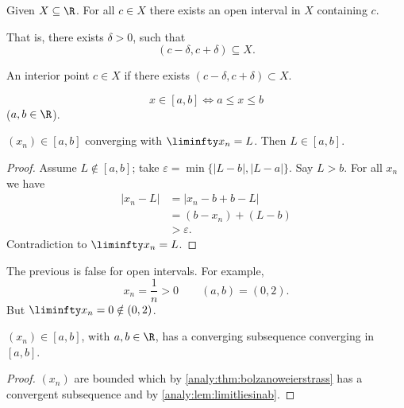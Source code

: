 \documentclass[10pt, a4paper]{article}
\begin{document}
\begin{definition}
    Given $X \subseteq \R$. For all $c \in X$ there exists an open interval in $X$ containing $c$.
    
    That is,
    there exists $\delta > 0$,
    such that
    \[
    (c - \delta, c + \delta) \subseteq X.
    \]
\end{definition}

\begin{definition}
    An interior point $c \in X$ if there exists $(c - \delta, c + \delta) \subset X$.
\end{definition}

\begin{definition}
    \[
    x \in [a, b] \iff a \leq x \leq b
    \]
    ($a, b \in \R$).
\end{definition}

\begin{lemma}\label{analy:lem:limitliesinab}
    $(x_n) \in [a, b]$ converging with $\liminfty x_n = L$.
    Then $L \in [a, b]$.
    \begin{proof}
        Assume $L \notin [a, b]$;
        take $\varepsilon = \min\{|L - b|, |L - a|\}$.
        Say $L > b$.
        For all $x_n$ we have
        \begin{align*}
            |x_n - L| &= |x_n - b + b - L| \\
            &= (b - x_n) + (L - b) \\
            &> \varepsilon.
        \end{align*}
        Contradiction to $\liminfty x_n = L$.
    \end{proof}
\end{lemma}

\begin{remark}
    The previous is false for open intervals.
    For example,
    \[
    x_n = \frac{1}{n} > 0\qquad(a, b) = (0, 2).
    \]
    But $\liminfty x_n = 0 \notin (0, 2)$.
\end{remark}

\begin{theorem}
    $(x_n) \in [a, b]$,
    with $a, b \in \R$,
    has a converging subsequence converging in $[a, b]$.
    \begin{proof}
        $(x_n)$ are bounded which by \autoref{analy:thm:bolzanoweierstrass} has a convergent subsequence and by \autoref{analy:lem:limitliesinab}.
    \end{proof}
\end{theorem}
\end{document}
